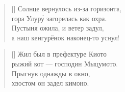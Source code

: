 \documentclass[14pt]{memoir}
\begin{document}

\begin{verse}[\versewidth]
Солнце вернулось из-за горизонта,\\
гора Улур\'{у} загорелась как охра.\\
Пустыня ожила, и ветер задул,\\
а наш кенгурёнок наконец-то уснул!
\end{verse}

\label{uluru}
\BgThispage

\newpage



\PlainPoemTitle
{}
\begin{verse}[\versewidth]
Жил был в префектуре Киото\\
рыжий кот --- господин Мыцумото.\\
Прыгнув однажды в окно, \\
хвостом он задел кимоно. 
\end{verse}
\end{document}
